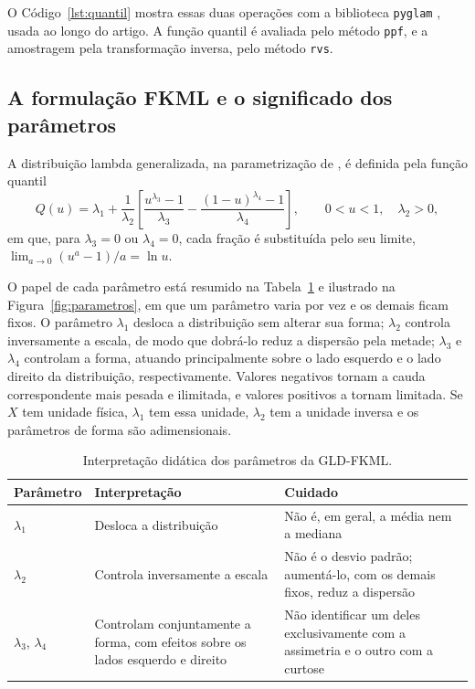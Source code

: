 O Código~\ref{lst:quantil} mostra essas duas operações com a biblioteca \texttt{pyglam} \parencite{pyglam}, usada ao longo do artigo. A função quantil é avaliada pelo método \texttt{ppf}, e a amostragem pela transformação inversa, pelo método \texttt{rvs}.



\subsection{A formulação FKML e o significado dos parâmetros}

A distribuição lambda generalizada, na parametrização de \textcite{freimer1988}, é definida pela função quantil
\begin{equation}
    Q(u) = \lambda_1 + \frac{1}{\lambda_2}
    \left[\frac{u^{\lambda_3} - 1}{\lambda_3} - \frac{(1-u)^{\lambda_4} - 1}{\lambda_4}\right],
    \qquad 0 < u < 1, \quad \lambda_2 > 0,
    \label{eq:fkml}
\end{equation}
em que, para $\lambda_3 = 0$ ou $\lambda_4 = 0$, cada fração é substituída pelo seu limite, $\lim_{a \to 0} (u^a - 1)/a = \ln u$.

O papel de cada parâmetro está resumido na Tabela~\ref{tab:parametros} e ilustrado na Figura~\ref{fig:parametros}, em que um parâmetro varia por vez e os demais ficam fixos. O parâmetro $\lambda_1$ desloca a distribuição sem alterar sua forma; $\lambda_2$ controla inversamente a escala, de modo que dobrá-lo reduz a dispersão pela metade; $\lambda_3$ e $\lambda_4$ controlam a forma, atuando principalmente sobre o lado esquerdo e o lado direito da distribuição, respectivamente. Valores negativos tornam a cauda correspondente mais pesada e ilimitada, e valores positivos a tornam limitada. Se $X$ tem unidade física, $\lambda_1$ tem essa unidade, $\lambda_2$ tem a unidade inversa e os parâmetros de forma são adimensionais.

\begin{table}[htbp]
\centering
\caption{Interpretação didática dos parâmetros da GLD-FKML.}
\label{tab:parametros}
\small
\begin{tabular}{p{1.8cm} p{5.6cm} p{6.6cm}}
\toprule
\textbf{Parâmetro} & \textbf{Interpretação} & \textbf{Cuidado} \\
\midrule
$\lambda_1$ & Desloca a distribuição & Não é, em geral, a média nem a mediana \\
$\lambda_2$ & Controla inversamente a escala & Não é o desvio padrão; aumentá-lo, com os demais fixos, reduz a dispersão \\
$\lambda_3$, $\lambda_4$ & Controlam conjuntamente a forma, com efeitos sobre os lados esquerdo e direito & Não identificar um deles exclusivamente com a assimetria e o outro com a curtose \\
\bottomrule
\end{tabular}
\end{table}

